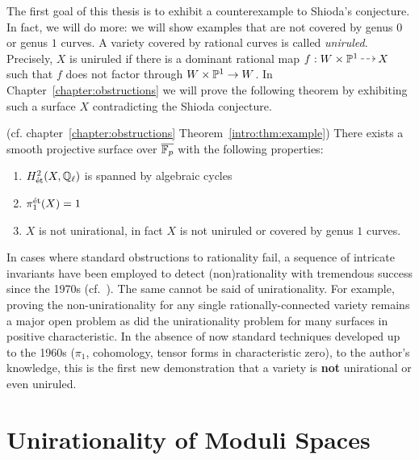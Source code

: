 \documentclass[main.tex]{subfiles}
\begin{document}
The first goal of this thesis is to exhibit a counterexample to Shioda's conjecture. In fact, we will do more: we will show examples that are not covered by genus $0$ or genus $1$ curves. A variety covered by rational curves is called \textit{uniruled}. Precisely, $X$ is uniruled if there is a dominant rational map $f : W \times \P^1 \rat X$ such that $f$ does not factor through $W \times \P^1 \to W$. In Chapter~\ref{chapter:obstructions} we will prove the following theorem by exhibiting such a surface $X$ contradicting the Shioda conjecture.

\begin{theorem} \label{chapter_intro:thm:main} (cf. chapter~\ref{chapter:obstructions} Theorem~\ref{intro:thm:example})
There exists a smooth projective surface over $\ol{\FF_p}$ with the following properties:
\begin{enumerate}
\item $H^2_{\et}(X, \Q_{\ell})$ is spanned by algebraic cycles
\item $\pi_1^{\et}(X) = 1$
\item $X$ is not unirational, in fact $X$ is not uniruled or covered by genus $1$ curves. 
\end{enumerate}
\end{theorem}

In cases where standard obstructions to rationality fail, a sequence of intricate invariants have been employed to detect (non)rationality with tremendous success since the 1970s (cf.\ \cite{IM71, AM72,CG72, Kol95, Voi15, Tot16, HPT19, Sch19}). The same cannot be said of unirationality. For example, proving the non-unirationality for any single rationally-connected variety remains a major open problem as did the unirationality problem for many surfaces in positive characteristic. In the absence of now standard techniques developed up to the 1960s (\etale $\pi_1$, \etale cohomology, tensor forms in characteristic zero), to the author's knowledge, this is the first new demonstration that a variety is \textbf{not} unirational or even uniruled.

\section{Unirationality of Moduli Spaces}
\end{document}
